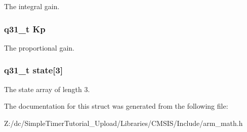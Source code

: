 The integral gain. \hypertarget{structarm__pid__instance__q31_a6ec4b37fe2246a7e017dd07578fe5bbd}{
\subsubsection[{Kp}]{\setlength{\rightskip}{0pt plus 5cm}q31\-\_\-t Kp}}\label{structarm__pid__instance__q31_a6ec4b37fe2246a7e017dd07578fe5bbd}
The proportional gain. \hypertarget{structarm__pid__instance__q31_af0a2da4da9a94af652873ec7e7be4880}{
\subsubsection[{state}]{\setlength{\rightskip}{0pt plus 5cm}q31\-\_\-t state\mbox{[}3\mbox{]}}}\label{structarm__pid__instance__q31_af0a2da4da9a94af652873ec7e7be4880}
The state array of length 3. 

The documentation for this struct was generated from the following file\-:\begin{DoxyCompactItemize}
\item 
Z\-:/dc/\-Simple\-Timer\-Tutorial\-\_\-\-Upload/\-Libraries/\-C\-M\-S\-I\-S/\-Include/arm\-\_\-math.\-h\end{DoxyCompactItemize}
